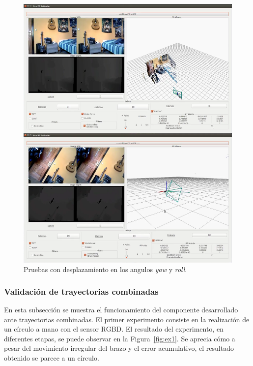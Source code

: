 \begin{figure}[th]
\centering
\includegraphics[scale=0.35]{Figures/tests/yaw-roll.png}
\decoRule
\caption[Pruebas con desplazamiento en los angulos \textit{yaw} y \textit{roll}]{Pruebas con desplazamiento en los angulos \textit{yaw} y \textit{roll}.}
\label{fig:yaw-roll}
\end{figure}

\subsubsection{Validación de trayectorias combinadas}

En esta subsección se muestra el funcionamiento del componente desarrollado ante trayectorias combinadas. El primer experimento consiste en la realización de un círculo a mano con el sensor RGBD. El resultado del experimento, en diferentes etapas, se puede observar en la Figura~\ref{fig:ex1}. Se aprecia cómo a pesar del movimiento irregular del brazo y el error acumulativo, el resultado obtenido se parece a un círculo.

